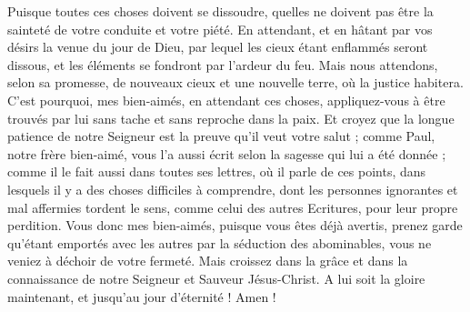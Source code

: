 \begin{multicols}{2}
Puisque toutes ces choses doivent se dissoudre, quelles ne doivent pas être la sainteté de votre conduite et votre piété.
En attendant, et en hâtant par vos désirs la venue du jour de Dieu, par lequel les cieux étant enflammés seront dissous, et les éléments se fondront par l'ardeur du feu.
Mais nous attendons, selon sa promesse, de nouveaux cieux et une nouvelle terre{}, où la justice habitera.
C'est pourquoi, mes bien-aimés, en attendant ces choses, appliquez-vous à être trouvés par lui sans tache et sans reproche dans la paix.
Et croyez que la longue patience de notre Seigneur est la preuve qu'il veut votre salut ; comme Paul, notre frère bien-aimé, vous l’a aussi écrit selon la sagesse qui lui a été donnée ;
comme il le fait aussi dans toutes ses lettres, où il parle de ces points, dans lesquels il y a des choses difficiles à comprendre, dont les personnes ignorantes et mal affermies tordent le sens{}, comme celui des autres Ecritures, pour leur propre perdition.
\TextTitle{[Conclusion]}
Vous donc mes bien-aimés, puisque vous êtes déjà avertis, prenez garde qu'étant emportés avec les autres par la séduction des abominables, vous ne veniez à déchoir de votre fermeté.
Mais croissez dans la grâce et dans la connaissance de notre Seigneur et Sauveur Jésus-Christ. A lui soit la gloire maintenant, et jusqu'au jour d'éternité ! Amen !
\PPE{}
\end{multicols}
